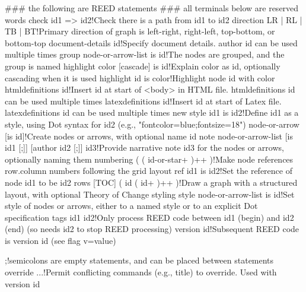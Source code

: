 ### the following are REED statements
### all terminals below are reserved words
check id1 => id2!Check there is a path from id1 to id2
direction {LR | RL | TB | BT}!Primary direction of graph is left-right, right-left, top-bottom, or bottom-top
document-details id!Specify document details. author id can be used multiple times
group node-or-arrow-list is id!The nodes are grouped, and the group is named
highlight color [cascade] is id!Explain color as id, optionally cascading when it is used
highlight id is color!Highlight node id with color
htmldefinitions id!Insert id at start of <body> in HTML file. htmldefinitions id can be used multiple times
latexdefinitions id!Insert id at start of Latex file. latexdefinitions id can be used multiple times
new style id1 is id2!Define id1 as a style, using Dot syntax for id2 (e.g., "fontcolor=blue;fontsize=18")
node-or-arrow [is id]!Create nodes or arrows, with optional name id
note node-or-arrow-list [is id1 [;]] [author id2 [;]] id3!Provide narrative note id3 for the nodes or arrows, optionally naming them
numbering ( {( id-or-star+ )}++ )!Make node references row.column numbers following the grid layout
ref id1 is id2!Set the reference of node id1 to be id2
rows [TOC] ( {id ( id+ )}++ )!Draw a graph with a structured layout, with optional Theory of Change styling
style node-or-arrow-list is id!Set style of nodes or arrows, either to a named style or to an explicit Dot specification
tags id1 id2!Only process REED code between id1 (begin) and id2 (end) (so needs id2 to stop REED processing)
version id!Subsequent REED code is version id (see flag v=value)

;!semicolons are empty statements, and can be placed between statements
override ...!Permit conflicting commands (e.g., title) to override. Used with version id



